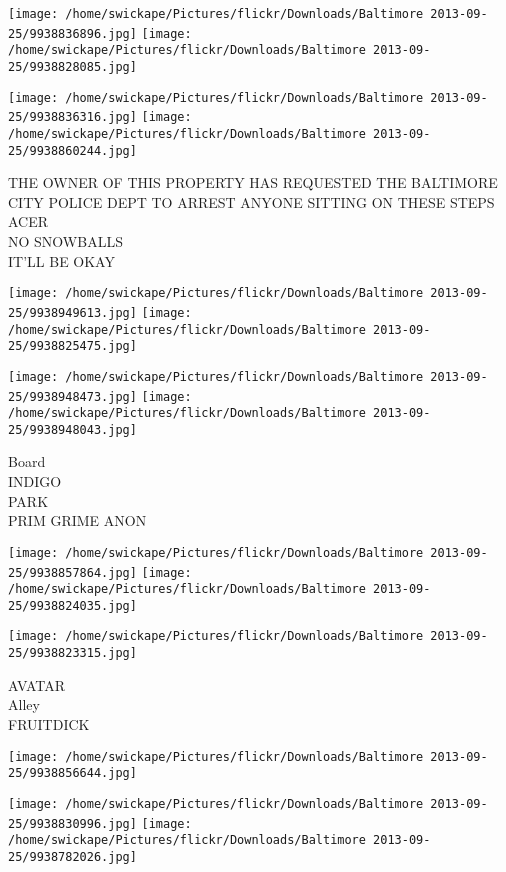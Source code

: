 \documentclass[10pt,letterpaper]{article}
\begin{document}
\texttt{[image: /home/swickape/Pictures/flickr/Downloads/Baltimore 2013-09-25/9938836896.jpg]}
\texttt{[image: /home/swickape/Pictures/flickr/Downloads/Baltimore 2013-09-25/9938828085.jpg]}

\texttt{[image: /home/swickape/Pictures/flickr/Downloads/Baltimore 2013-09-25/9938836316.jpg]}
\texttt{[image: /home/swickape/Pictures/flickr/Downloads/Baltimore 2013-09-25/9938860244.jpg]}

THE OWNER OF THIS PROPERTY HAS REQUESTED THE BALTIMORE CITY POLICE DEPT TO ARREST ANYONE SITTING ON THESE STEPS\\
ACER\\
NO SNOWBALLS\\
IT'LL BE OKAY
\pagebreak

\texttt{[image: /home/swickape/Pictures/flickr/Downloads/Baltimore 2013-09-25/9938949613.jpg]}
\texttt{[image: /home/swickape/Pictures/flickr/Downloads/Baltimore 2013-09-25/9938825475.jpg]}

\texttt{[image: /home/swickape/Pictures/flickr/Downloads/Baltimore 2013-09-25/9938948473.jpg]}
\texttt{[image: /home/swickape/Pictures/flickr/Downloads/Baltimore 2013-09-25/9938948043.jpg]}

Board\\
INDIGO\\
PARK\\
PRIM GRIME ANON
\pagebreak

\texttt{[image: /home/swickape/Pictures/flickr/Downloads/Baltimore 2013-09-25/9938857864.jpg]}
\texttt{[image: /home/swickape/Pictures/flickr/Downloads/Baltimore 2013-09-25/9938824035.jpg]}

\vspace{0.25in}
\texttt{[image: /home/swickape/Pictures/flickr/Downloads/Baltimore 2013-09-25/9938823315.jpg]}

AVATAR\\
Alley\\
FRUITDICK
\pagebreak

\texttt{[image: /home/swickape/Pictures/flickr/Downloads/Baltimore 2013-09-25/9938856644.jpg]}

\vspace{0.25in}
\texttt{[image: /home/swickape/Pictures/flickr/Downloads/Baltimore 2013-09-25/9938830996.jpg]}
\texttt{[image: /home/swickape/Pictures/flickr/Downloads/Baltimore 2013-09-25/9938782026.jpg]}
\end{document}
